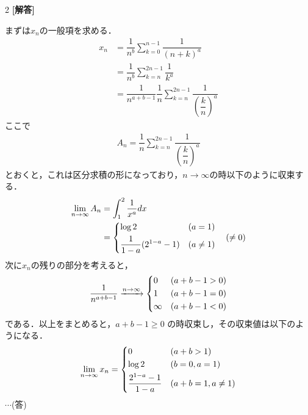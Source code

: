 \documentclass[../../main.tex]{subfiles}
\begin{document}
\setcounter{equation}{0}
\setcounter{figure}{0}
\setcounter{table}{0}
\begin{oframed}
  
\end{oframed}
\setlength{\columnseprule}{0.4pt}
\begin{multicols}{2}
  {\bf [解答]}

  まずは$x_n$の一般項を求める．
  \begin{align}
    x_n
    & = \dfrac{1}{n^{b}} \sum_{k=0}^{n-1} \dfrac{1}{(n+k)^a}                                    \\
    & = \dfrac{1}{n^{b}} \sum_{k=n}^{2n-1} \dfrac{1}{k^a}                                       \\
    & = \dfrac{1}{n^{a+b-1}} \dfrac{1}{n}\sum_{k=n}^{2n-1} \dfrac{1}{\left(\dfrac{k}{n}\right)^a}
  \end{align}
  ここで
  \begin{align}
    A_n = \dfrac{1}{n}\sum_{k=n}^{2n-1} \dfrac{1}{\left(\dfrac{k}{n}\right)^a}
  \end{align}
  とおくと，これは区分求積の形になっており，$n\to\infty$の時以下のように収束する．
  \begin{align}
    \lim_{n\to\infty} A_n
    & = \int_1^2 \dfrac{1}{x^a} dx \\
    & =
    \begin{dcases}
      \log 2                   & (a=1)     \\
      \dfrac{1}{1-a}(2^{1-a}-1) & (a \ne 1)
    \end{dcases} \quad (\ne 0)
  \end{align}
  次に$x_n$の残りの部分を考えると，
  \begin{align}
    \dfrac{1}{n^{a+b-1}} \xrightarrow{n \to \infty}
    \begin{dcases}
      0      & (a+b-1 > 0) \\
      1      & (a+b-1 = 0) \\
      \infty & (a+b-1 < 0)
    \end{dcases}
  \end{align}
  である．以上をまとめると，$a+b-1 \ge 0$ の時収束し，その収束値は以下のようになる．
  \begin{align}
    \lim_{n\to\infty} x_n =
    \begin{dcases}
      0                     & (a+b>1)          \\
      \log 2                & (b=0, a=1)       \\
      \dfrac{2^{1-a}-1}{1-a} & (a+b=1, a \ne 1)
    \end{dcases}
  \end{align}
  $\cdots$(答)


\end{multicols}
\end{document}
